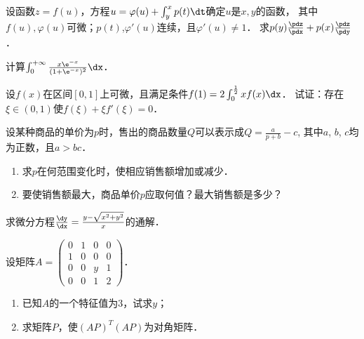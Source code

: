 \documentclass[plain,noanswer,medmath]{../../template/jnuexam}
\begin{document}

\begin{problem}
设函数$z = f(u)$，方程$u = \varphi(u) + \int_y^x p(t)\dt$确定$u$是$x,y$的函数，
其中$f(u),\varphi(u)$可微；$p(t)$,$\varphi'(u)$连续，且$\varphi'(u) \ne 1$．
求$p(y)\frac{\pdz}{\pdx} + p(x)\frac{\pdz}{\pdy}$．
\end{problem}



\begin{problem}
计算$\int_0^{+\infty} \frac{x\e^{- x}}{(1 + \e^{- x})^2} \dx$．
\end{problem}



\begin{problem}
设$f(x)$在区间$[0,1]$上可微，且满足条件$f(1) = 2\int_0^{\frac{1}{2}} xf(x)\dx$．
试证：存在$\xi \in(0,1)$使$f(\xi) + \xi f'(\xi) = 0$．
\end{problem}



\begin{problem}
设某种商品的单价为$p$时，售出的商品数量$Q$可以表示成$Q = \frac{a}{p + b} - c$,
其中$a$, $b$, $c$均为正数，且$a > bc$．
\begin{enumerate}
\item 求$p$在何范围变化时，使相应销售额增加或减少．
\item 要使销售额最大，商品单价$p$应取何值？最大销售额是多少？
\end{enumerate}
\end{problem}



\begin{problem}
求微分方程$\frac{\dy}{\dx} = \frac{y - \sqrt{x^2 + y^2}}{x}$的通解．
\end{problem}



\begin{problem}
设矩阵$A = \begin{pmatrix}
  0 & 1 & 0 & 0 \\
  1 & 0 & 0 & 0 \\
  0 & 0 & y & 1 \\
  0 & 0 & 1 & 2
\end{pmatrix}$．
\begin{enumerate}
\item 已知$A$的一个特征值为$3$，试求$y$；
\item 求矩阵$P$，使$(AP)^T(AP)$为对角矩阵．
\end{enumerate}
\end{problem}
\end{document}
